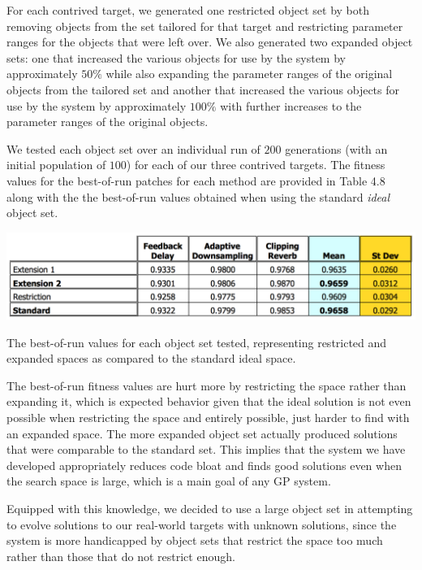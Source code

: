 \documentclass[a4paper,12pt]{report} 	%
\numberwithin{figure}{chapter}
\numberwithin{table}{chapter}
\numberwithin{equation}{chapter}
\begin{document}
\begin{flushleft}
For each contrived target, we generated one restricted object set by both removing objects from the set tailored for that target and restricting parameter ranges for the objects that were left over. We also generated two expanded object sets: one that increased the various objects for use by the system by approximately $50\%$ while also expanding the parameter ranges of the original objects from the tailored set and another that increased the various objects for use by the system by approximately $100\%$ with further increases to the parameter ranges of the original objects.

We tested each object set over an individual run of $200$ generations (with an initial population of $100$) for each of our three contrived targets. The fitness values for the best-of-run patches for each method are provided in Table 4.8 along with the the best-of-run values obtained when using the standard \emph{ideal} object set.

\begin{table}[h!]
\begin{center}
\includegraphics[scale=0.6,width=\linewidth]{ExpansionRestrictionTable}
\caption[Restriction/Expansion Best-of-Run Values]{The best-of-run values for each object set tested, representing restricted and expanded spaces as compared to the standard ideal space.}
\end{center}
\end{table}

The best-of-run fitness values are hurt more by restricting the space rather than expanding it, which is expected behavior given that the ideal solution is not even possible when restricting the space and entirely possible, just harder to find with an expanded space. The more expanded object set actually produced solutions that were comparable to the standard set. This implies that the system we have developed appropriately reduces code bloat and finds good solutions even when the search space is large, which is a main goal of any GP system. 

Equipped with this knowledge, we decided to use a large object set in attempting to evolve solutions to our real-world targets with unknown solutions, since the system is more handicapped by object sets that restrict the space too much rather than those that do not restrict enough.


\end{flushleft}
\end{document}
